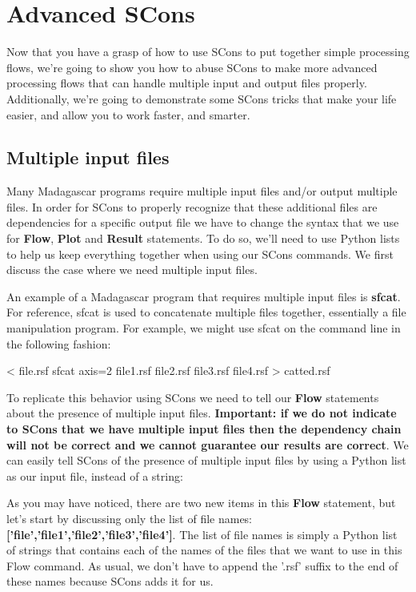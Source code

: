 \section{Advanced SCons}

Now that you have a grasp of how to use SCons to put together simple processing flows, we're going to show you how to abuse SCons to make more advanced processing flows that can handle multiple input and output files properly.  Additionally, we're going to demonstrate some SCons tricks that make your life easier, and allow you to work faster, and smarter.

\subsection{Multiple input files}

Many Madagascar programs require multiple input files and/or output multiple files.  In order for SCons to properly recognize that these additional files are dependencies for a specific output file we have to change the syntax that we use for \textbf{Flow}, \textbf{Plot} and \textbf{Result} statements.  To do so, we'll need to use Python lists to help us keep everything together when using our SCons commands.  We first discuss the case where we need multiple input files.  

An example of a Madagascar program that requires multiple input files is \textbf{sfcat}.  For reference, sfcat is used to concatenate multiple files together, essentially a file manipulation program.  For example, we might use sfcat on the command line in the following fashion:
\begin{verbatimtab}[4]
< file.rsf sfcat axis=2 
    file1.rsf file2.rsf file3.rsf file4.rsf > catted.rsf
\end{verbatimtab}
To replicate this behavior using SCons we need to tell our \textbf{Flow} statements about the presence of multiple input files.  \textbf{Important: if we do not indicate to SCons that we have multiple input files then the dependency chain will not be correct and we cannot guarantee our results are correct}.  We can easily tell SCons of the presence of multiple input files by using a Python list as our input file, instead of a string:
As you may have noticed, there are two new items in this \textbf{Flow} statement, but let's start by discussing only the list of file names: \textbf{['file','file1','file2','file3','file4']}.  The list of file names is simply a Python list of strings that contains each of the names of the files that we want to use in this Flow command.  As usual, we don't have to append the '.rsf' suffix to the end of these names because SCons adds it for us.  

